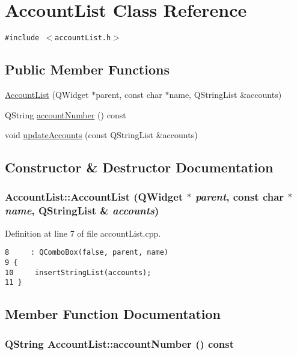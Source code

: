 \hypertarget{classAccountList}{
\section{Account\-List Class Reference}
\label{classAccountList}
}
{\tt \#include $<$account\-List.h$>$}

\subsection*{Public Member Functions}
\begin{CompactItemize}
\item 
\hyperlink{classAccountList_a0}{Account\-List} (QWidget $\ast$parent, const char $\ast$name, QString\-List \&accounts)
\item 
QString \hyperlink{classAccountList_a1}{account\-Number} () const
\item 
void \hyperlink{classAccountList_a2}{update\-Accounts} (const QString\-List \&accounts)
\end{CompactItemize}


\subsection{Constructor \& Destructor Documentation}
\hypertarget{classAccountList_a0}{
\subsubsection[AccountList]{\setlength{\rightskip}{0pt plus 5cm}Account\-List::Account\-List (QWidget $\ast$ {\em parent}, const char $\ast$ {\em name}, QString\-List \& {\em accounts})}}
\label{classAccountList_a0}


Definition at line 7 of file account\-List.cpp.

\footnotesize\begin{verbatim}8     : QComboBox(false, parent, name)
9 {
10     insertStringList(accounts);
11 }
\end{verbatim}\normalsize 




\subsection{Member Function Documentation}
\hypertarget{classAccountList_a1}{
\subsubsection[accountNumber]{\setlength{\rightskip}{0pt plus 5cm}QString Account\-List::account\-Number () const}}
\label{classAccountList_a1}


